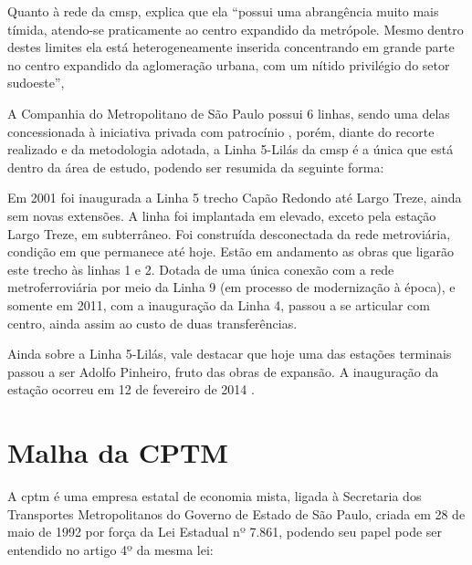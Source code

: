 	Quanto à rede da \gls{cmsp},  explica que ela ``possui uma abrangência muito mais tímida, atendo-se praticamente ao centro expandido da metrópole. Mesmo dentro destes limites ela está heterogeneamente inserida concentrando em grande parte no centro expandido da aglomeração urbana, com  um nítido privilégio do setor sudoeste'',
	
	A Companhia do Metropolitano de São Paulo possui 6 linhas, sendo uma delas concessionada à iniciativa privada com patrocínio \cite[págs. 60-62]{Isoda}, porém, diante do recorte realizado e da metodologia adotada, a Linha 5-Lilás da \gls{cmsp} é a única que está dentro da área de estudo, podendo ser resumida da seguinte forma:
	
	\begin{citacao}
		Em  2001  foi  inaugurada  a  Linha  5  trecho  Capão  Redondo  até  Largo 	Treze, ainda sem novas extensões. A linha foi implantada em elevado, 	exceto  pela  estação  Largo  Treze,  em  subterrâneo.  Foi  construída 	desconectada  da  rede  metroviária,  condição  em  que  permanece  até 	hoje. Estão em andamento as obras que ligarão este trecho às linhas 1 e  2.  Dotada  de  uma  única  conexão  com  a  rede  metroferroviária  por 	meio  da  Linha  9  (em  processo  de  modernização  à  época),  e  somente em  2011,  com  a  inauguração  da  Linha  4,  passou  a  se  articular  com 
		centro, ainda assim ao custo de duas transferências. \cite{Isoda}
	\end{citacao}
	
	Ainda sobre a Linha 5-Lilás, vale destacar que hoje uma das estações terminais passou a ser Adolfo Pinheiro, fruto das obras de expansão. A inauguração da estação ocorreu em 12 de fevereiro de 2014 \cite{adolfopin}.
	
	\section{Malha da CPTM}
	
	A {\glsdesc*{cptm}} é uma empresa estatal de economia mista, ligada à Secretaria dos Transportes Metropolitanos do Governo de Estado de São Paulo, criada em 28 de maio de 1992 por força da Lei Estadual nº 7.861\cite{sitecptm1}, podendo seu papel pode ser entendido no artigo 4º da mesma lei:
	
